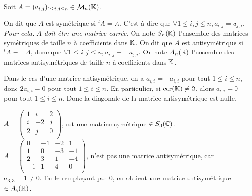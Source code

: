 \documentclass[12pt, a4paper]{report}
\begin{document}
\begin{definition}
    Soit $A = (a_{i,j})_{1 \leq i, j \leq n} \in \mathcal M_{n}(\mathbb{K})$.
    
    \begin{outline}
        \1 On dit que $A$ est symétrique si $^tA = A$. C'est-à-dire que $\forall 1 \leq i,j \leq n, a_{i,j} = a_{j,i}$.
            \2 \textit{Pour cela, $A$ doit être une matrice carrée.}
            \2 On note $S_n(\mathbb{K})$ l'ensemble des matrices symétriques de taille $n$ à coefficients dans $\mathbb{K}$.
        \1 On dit que $A$ est antisymétrique si $^tA = -A$, donc que $\forall 1 \leq i,j \leq n, a_{i,j} = -a_{j,i}$.
            \2 On note $A_n(\mathbb{K})$ l'ensemble des matrices antisymétriques de taille $n$ à coefficients dans $\mathbb{K}$.
    \end{outline}
\end{definition}

\begin{remark}
    Dans le cas d'une matrice antisymétrique, on a $a_{i,i} = -a_{i,i}$ pour tout $1 \leq i \leq n$, donc $2 a_{i,i} = 0$ pour tout $1 \leq i \leq n$. En particulier, si $\mathrm{car}(\mathbb{K}) \neq 2$, alors $a_{i,i} = 0$ pour tout $1 \leq i \leq n$. Donc la diagonale de la matrice antisymétrique est nulle.
\end{remark}

\begin{example}
    \begin{outline}
        \1 $A = \left(\begin{matrix}
            1 & i & 2 \\
            i & -2 & j \\
            2 & j & 0 \\
        \end{matrix}\right)$, est une matrice symétrique $\in S_3(\mathbb{C})$.
        \1 $A = \left(\begin{matrix}
            0 & -1 & -2 & 1 \\
            1 & 0 & -3 & -1 \\
            2 & 3 & 1 & -4 \\
            -1 & 1 & 4 & 0 \\
        \end{matrix}\right)$, n'est pas une matrice antisymétrique, car $a_{3,3} = 1 \neq 0$. En le remplaçant par $0$, on obtient une matrice antisymétrique $\in A_4(\mathbb{R})$.
    \end{outline}
\end{example}
\end{document}
